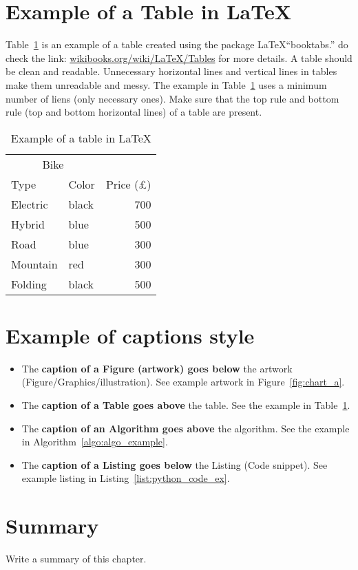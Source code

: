 \section{Example of a Table in \LaTeX}
Table~\ref{tab:_ex_tab} is an example of a table created using the package \LaTeX  ``booktabs.'' do check the link: \href{https://en.wikibooks.org/wiki/LaTeX/Tables}{wikibooks.org/wiki/LaTeX/Tables} for more details. A table should be clean and readable. Unnecessary horizontal lines and vertical lines in tables make them unreadable and messy. The example in Table~\ref{tab:_ex_tab} uses a minimum number of liens (only necessary ones). Make sure that the top rule and bottom rule (top and bottom horizontal lines) of a table are present. 

\begin{table}[h!]
    \centering
    \caption{Example of a table in \LaTeX}
    \label{tab:_ex_tab}
    \begin{tabular}{llr}     
        \toprule
        \multicolumn{2}{c}{Bike} \\
        \cmidrule(r){1-2}
        Type    &  Color & Price (\pounds) \\
        \midrule
        Electric    & black   & 700   \\
        Hybrid      & blue    & 500   \\
        Road        & blue    & 300   \\
        Mountain    & red     & 300   \\
        Folding     & black   & 500   \\
        \bottomrule
    \end{tabular}
\end{table}

\section{Example of captions style}

\begin{itemize}
    \item The \textbf{caption of a Figure (artwork) goes below} the artwork (Figure/Graphics/illustration). See example artwork in Figure~\ref{fig:chart_a}. 
    \item  The \textbf{caption of a Table goes above} the table. See the example in Table~\ref{tab:_ex_tab}.
    \item  The \textbf{caption of an Algorithm goes above} the algorithm. See the example in Algorithm~\ref{algo:algo_example}.
    \item The \textbf{caption of a Listing goes below} the Listing  (Code snippet). See example listing in Listing~\ref{list:python_code_ex}. 
\end{itemize} 





\section{Summary}
Write a summary of this chapter.



